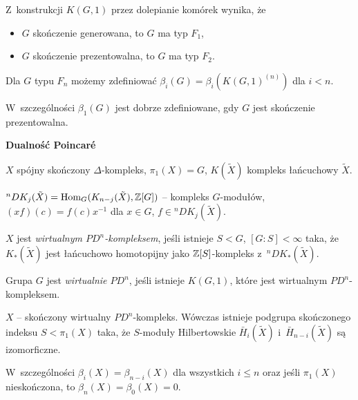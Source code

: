 \begin{wniosek}
	Z~konstrukcji $K(G, 1)$ przez dolepianie komórek wynika, że
	\begin{itemize}
		\item $G$ skończenie generowana, to $G$ ma typ $F_1$,
		\item $G$ skończenie prezentowalna, to $G$ ma typ $F_2$.
	\end{itemize}
\end{wniosek}

\begin{wniosek}
	Dla $G$ typu $F_n$ możemy zdefiniować 
	$\beta_i(G) = \beta_i(K(G, 1)^{(n)})$ dla $i<n$.
	
	W~szczególności $\beta_1(G)$ jest dobrze zdefiniowane,
	gdy $G$ jest skończenie prezentowalna.
\end{wniosek}

{\bf Dualność Poincar\'{e}}

$X$ spójny skończony $\Delta$-kompleks, $\pi_1(X) = G$, 
$K(\tilde{X})$ kompleks łańcuchowy $\tilde{X}$.

\begin{definicja}
	${}^nDK_j(\tilde{X}) = {\mathrm{Hom}}_G(K_{n-j}(\tilde{X}), {\mathbb{Z}}[G])$ 
	-- kompleks $G$-modułów, 
	${(xf)(c) = f(c) x^{-1}}$ dla $x \in G$, $f \in {}^nDK_j(\tilde{X})$.
\end{definicja}

\begin{definicja}
	$X$ jest \emph{wirtualnym $PD^n$-kompleksem}, jeśli 
	istnieje $S < G$, $[G:S] < \infty$ taka, że
	$K_\ast(\tilde{X})$ jest łańcuchowo homotopijny
	jako ${\mathbb{Z}}[S]$-kompleks z~${}^nDK_\ast(\tilde{X})$.
\end{definicja}

\begin{definicja}
	Grupa $G$ jest \emph{wirtualnie $PD^n$}, jeśli 
	istnieje $K(G, 1)$, które jest wirtualnym $PD^n$-kompleksem.
\end{definicja}

\begin{twierdzenie}
	$X$ -- skończony wirtualny $PD^n$-kompleks.
	Wówczas istnieje podgrupa skończonego indeksu $S < \pi_1(X)$
	taka, że $S$-moduły Hilbertowskie $\bar{H}_i(\tilde{X})$
	i~$\bar{H}_{n-i}(\tilde{X})$ są izomorficzne.
	
	W~szczególności $\beta_i(X) = \beta_{n-i}(X)$ dla wszystkich
	$i \leq n$ oraz jeśli $\pi_1(X)$ nieskończona,
	to $\beta_n(X) = \beta_0(X) = 0$.
\end{twierdzenie}


